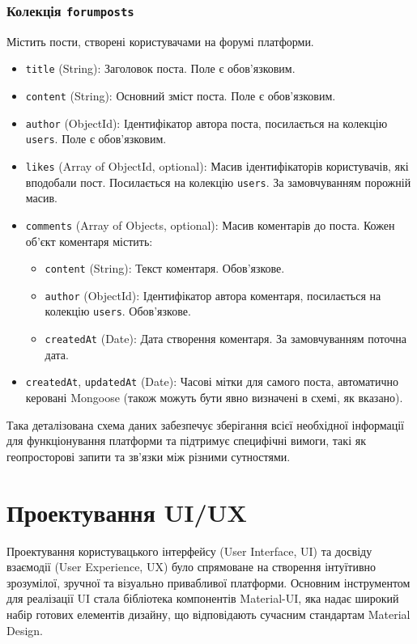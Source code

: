 \subsubsection*{Колекція \texttt{forumposts}}
Містить пости, створені користувачами на форумі платформи.
\begin{itemize}
    \item \texttt{title} (String): Заголовок поста. Поле є обов'язковим.
    \item \texttt{content} (String): Основний зміст поста. Поле є обов'язковим.
    \item \texttt{author} (ObjectId): Ідентифікатор автора поста, посилається на колекцію \texttt{users}. Поле є обов'язковим.
    \item \texttt{likes} (Array of ObjectId, optional): Масив ідентифікаторів користувачів, які вподобали пост. Посилається на колекцію \texttt{users}. За замовчуванням порожній масив.
    \item \texttt{comments} (Array of Objects, optional): Масив коментарів до поста. Кожен об'єкт коментаря містить:
    \begin{itemize}
        \item \texttt{content} (String): Текст коментаря. Обов'язкове.
        \item \texttt{author} (ObjectId): Ідентифікатор автора коментаря, посилається на колекцію \texttt{users}. Обов'язкове.
        \item \texttt{createdAt} (Date): Дата створення коментаря. За замовчуванням поточна дата.
    \end{itemize}
    \item \texttt{createdAt}, \texttt{updatedAt} (Date): Часові мітки для самого поста, автоматично керовані Mongoose (також можуть бути явно визначені в схемі, як вказано).
\end{itemize}
Така деталізована схема даних забезпечує зберігання всієї необхідної інформації для функціонування платформи та підтримує специфічні вимоги, такі як геопросторові запити та зв'язки між різними сутностями.


\section{Проектування UI/UX}
\label{sec:ui_ux}
Проектування користувацького інтерфейсу (User Interface, UI) та досвіду взаємодії (User Experience, UX) було спрямоване на створення інтуїтивно зрозумілої, зручної та візуально привабливої платформи. Основним інструментом для реалізації UI стала бібліотека компонентів Material-UI, яка надає широкий набір готових елементів дизайну, що відповідають сучасним стандартам Material Design. 

